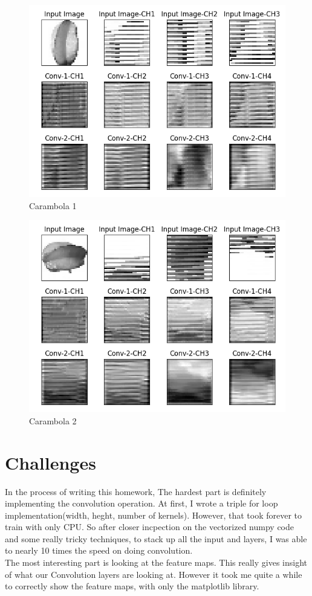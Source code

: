 \documentclass[a4paper, 10]{article}
\begin{document}
    \begin{figure}[h]
        \centering
        \includegraphics[width=\textwidth]{carambola.png}
        \caption{Carambola 1} \label{fig:8}
    \end{figure}
    \begin{figure}[h]
        \centering
        \includegraphics[width=\textwidth]{carambola1.png}
        \caption{Carambola 2} \label{fig:9}
    \end{figure}
\section{Challenges}
    In the process of writing this homework, The hardest part
    is definitely implementing the convolution operation.
    At first, I wrote a triple for loop implementation(width, heght,
    number of kernels). However, that took forever to train with 
    only CPU. So after closer incpection on the vectorized numpy
    code and some really tricky techniques, to stack up all the 
    input and layers, I was able to nearly 10 times the speed
    on doing convolution. \\
    \indent The most interesting part is looking at the feature maps.
    This really gives insight of what our Convolution layers are
    looking at. However it took me quite a while to correctly 
    show the feature maps, with only the matplotlib library.
\end{document}
